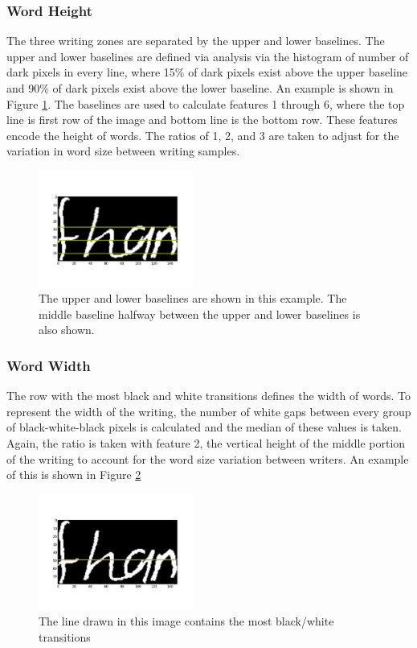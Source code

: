 \documentclass[paper=a4, fontsize=11pt]{scrartcl} %
\numberwithin{equation}{section} %
\numberwithin{figure}{section} %
\numberwithin{table}{section} %
\begin{document}
\subsubsection{Word Height}
The three writing zones are separated by the upper and lower
baselines. The upper and lower baselines are defined via analysis via
the histogram of number of dark pixels in every line, where 15\% of
dark pixels exist above the upper baseline and 90\% of dark pixels
exist above the lower baseline. An example is shown in Figure
\ref{fig:wordheight}. The baselines are used to calculate features 1
through 6, where the top line is first row of the image and bottom
line is the bottom row. These features encode the height of words. The
ratios of 1, 2, and 3 are taken to adjust for the variation in word
size between writing samples.

\begin{figure}
  \centering \includegraphics[width=2in]{wordheight.png}
  \caption{The upper and lower baselines are shown in this
    example. The middle baseline halfway between the upper and lower
    baselines is also shown.}
  \label{fig:wordheight}
\end{figure}

\subsubsection{Word Width}
The row with the most black and white transitions defines the width of
words. To represent the width of the writing, the number of white gaps
between every group of black-white-black pixels is calculated and the
median of these values is taken. Again, the ratio is taken with feature 2,
the vertical height of the middle portion of the writing to account
for the word size variation between writers. An example of this is
shown in Figure \ref{fig:wordwidth}

\begin{figure}
  \centering \includegraphics[width=2in]{wordwidth.png}
  \caption{The line drawn in this image contains the most black/white
    transitions}
  \label{fig:wordwidth}
\end{figure}
\end{document}
